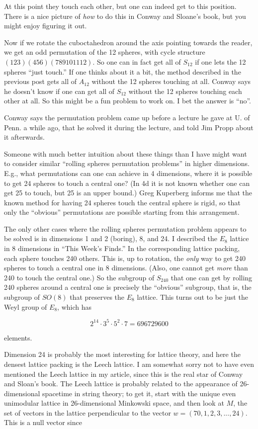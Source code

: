 \documentclass{article}
\begin{document}
At this point they touch each other, but one can indeed get to this
position. There is a nice picture of \emph{how} to do this in Conway and
Sloane's book, but you might enjoy figuring it out.

Now if we rotate the cuboctahedron around the axis pointing towards the
reader, we get an odd permutation of the 12 spheres, with cycle
structure \((1 2 3)(4 5 6)(7 8 9 10 11 12)\). So one can in fact get all
of \(S_{12}\) if one lets the 12 spheres ``just touch.'' If one thinks
about it a bit, the method described in the previous post gets all of
\(A_{12}\) without the 12 spheres touching at all. Conway says he
doesn't know if one can get all of \(S_{12}\) without the 12 spheres
touching each other at all. So this might be a fun problem to work on. I
bet the answer is ``no''.

Conway says the permutation problem came up before a lecture he gave at
U. of Penn. a while ago, that he solved it during the lecture, and told
Jim Propp about it afterwards.

Someone with much better intuition about these things than I have might
want to consider similar ``rolling spheres permutation problems'' in
higher dimensions. E.g., what permutations can one can achieve in 4
dimensions, where it is possible to get 24 spheres to touch a central
one? (In 4d it is not known whether one can get 25 to touch, but 25 is
an upper bound.) Greg Kuperberg informs me that the known method for
having 24 spheres touch the central sphere is rigid, so that only the
``obvious'' permutations are possible starting from this arrangement.

The only other cases where the rolling spheres permutation problem
appears to be solved is in dimensions 1 and 2 (boring), 8, and 24. I
described the \(E_8\) lattice in 8 dimensions in ``This Week's Finds.''
In the corresponding lattice packing, each sphere touches 240 others.
This is, up to rotation, the \emph{only} way to get 240 spheres to touch
a central one in 8 dimensions. (Also, one cannot get \emph{more} than
240 to touch the central one.) So the subgroup of \(S_{240}\) that one
can get by rolling 240 spheres around a central one is precisely the
``obvious'' subgroup, that is, the subgroup of \(SO(8)\) that preserves
the \(E_8\) lattice. This turns out to be just the Weyl group of
\(E_8\), which has

\[2^{14}\cdot 3^5\cdot 5^2\cdot 7 = 696729600\]

elements.

Dimension 24 is probably the most interesting for lattice theory, and
here the densest lattice packing is the Leech lattice. I am somewhat
sorry not to have even mentioned the Leech lattice in my article, since
this is the real star of Conway and Sloan's book. The Leech lattice is
probably related to the appearance of 26-dimensional spacetime in string
theory; to get it, start with the unique even unimodular lattice in
26-dimensional Minkowski space, and then look at \(M\), the set of
vectors in the lattice perpendicular to the vector
\(w = (70,1,2,3,...,24)\). This is a null vector since
\end{document}
